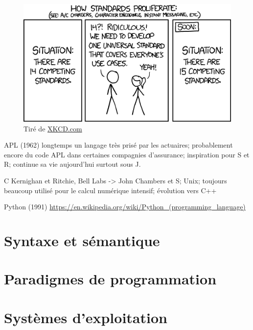 \begin{figure}[t]
  \centering
  \begin{minipage}{0.9\linewidth}
    \includegraphics{standards} \\
    \footnotesize\sffamily%
    Tiré de \href{http://xkcd.com/927/}{XKCD.com}
  \end{minipage}
\end{figure}

APL (1962) longtemps un langage très prisé par les actuaires; probablement
encore du code APL dans certaines compagnies d'assurance; inspiration
pour S et R; continue sa vie aujourd'hui surtout sous J.



C Kernighan et Ritchie, Bell Labs -> John Chambers et S; Unix;
toujours beaucoup utilisé pour le calcul numérique intensif; évolution
vers C++

Python (1991)
\url{https://en.wikipedia.org/wiki/Python_(programming_language)}







\section{Syntaxe et sémantique}
\label{sec:informatique:syntaxe}

\section{Paradigmes de programmation}
\label{sec:informatique:paradigmes}

\section{Systèmes d'exploitation}
\label{sec:informatique:os}



